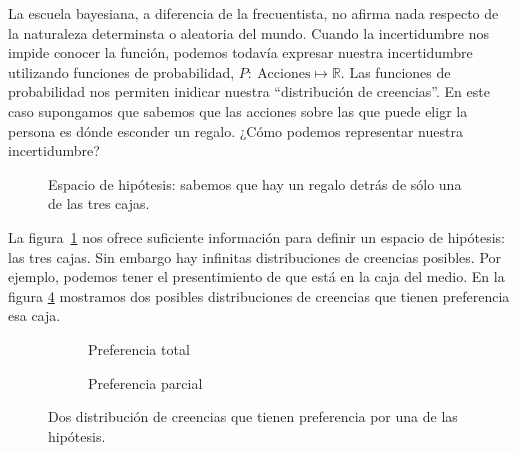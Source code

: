 \documentclass[a4paper,10pt]{book}
\begin{document}
La escuela bayesiana, a diferencia de la frecuentista, no afirma nada respecto de la naturaleza determinsta o aleatoria del mundo.
Cuando la incertidumbre nos impide conocer la función, podemos todavía expresar nuestra incertidumbre utilizando funciones de probabilidad, $P : \ \text{Acciones} \mapsto \mathbb{R}$.
Las funciones de probabilidad nos permiten inidicar nuestra ``distribución de creencias''.
En este caso supongamos que sabemos que las acciones sobre las que puede eligr la persona es dónde esconder un regalo.
¿Cómo podemos representar nuestra incertidumbre?
\begin{figure}[ht!]     
 \centering
 \caption{Espacio de hipótesis: sabemos que hay un regalo detrás de sólo una de las tres cajas.}
 \label{fig:espacio_de_hipotesis}
\end{figure}
La figura~\ref{fig:espacio_de_hipotesis} nos ofrece suficiente información para definir un espacio de hipótesis: las tres cajas.
Sin embargo hay infinitas distribuciones de creencias posibles.
Por ejemplo, podemos tener el presentimiento de que está en la caja del medio.
En la figura \ref{fig:distribucion_de_creencias} mostramos dos posibles distribuciones de creencias que tienen preferencia esa caja.

\begin{figure}[ht!]     
 \centering
 \begin{subfigure}[b]{0.48\textwidth}
 \centering
    \caption{Preferencia total}
    \label{fig:preferencia_total}
 \end{subfigure}
 \begin{subfigure}[b]{0.48\textwidth}
 \centering
    \caption{Preferencia parcial}
    \label{fig:preferencia_parcial}
 \end{subfigure}
\caption{Dos distribución de creencias que tienen preferencia por una de las hipótesis.}
 \label{fig:distribucion_de_creencias}
\end{figure}
\end{document}
